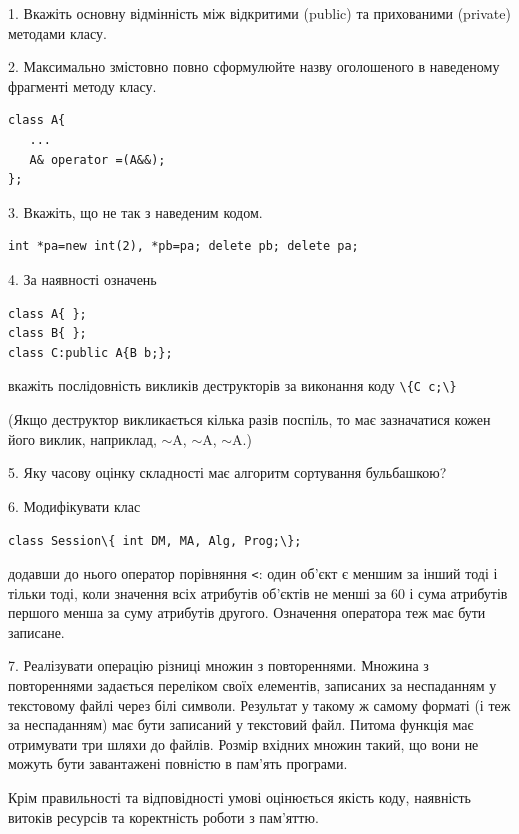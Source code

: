 \documentclass[12pt, ukrainian]{article}
\def\code#1{\Verb!#1!}
\begin{document}
{%
1. Вкажіть основну відмінність між відкритими (public) та прихованими (private) методами класу.%
\par
\vspace{2mm}
2. Максимально змістовно повно сформулюйте назву оголошеного в наведеному фрагменті методу класу.
\vspace{-3mm}
\begin{verbatim}class A{
   ...
   A& operator =(A&&);
};\end{verbatim}
\vspace{-3mm}
\par
\vspace{2mm}
3. Вкажіть, що не так з наведеним кодом.
\vspace{-3mm}
\begin{verbatim}int *pa=new int(2), *pb=pa; delete pb; delete pa;\end{verbatim}
\vspace{-3mm}
\par
\vspace{2mm}
4. За наявності означень
\vspace{-3mm}
\begin{verbatim}
class A{ };
class B{ };
class C:public A{B b;};\end{verbatim}
\vspace{-3mm}
вкажіть послідовність викликів деструкторів за виконання коду \code{\{C c;\}} 

(Якщо деструктор викликається кілька разів поспіль, то має зазначатися кожен його виклик, наприклад, $\sim$A, $\sim$A, $\sim$A.)

\vspace{2mm}
5. Яку часову оцінку складності має алгоритм сортування бульбашкою?
\par
\vspace{2mm}
6. Модифікувати клас 

\qquad\code{class Session\{ int DM, MA, Alg, Prog;\};} 


додавши до нього оператор порівняння \code{<}: один об'єкт є меншим за інший тоді і тільки тоді, коли значення всіх атрибутів об'єктів не менші за 60 і сума атрибутів першого менша за суму атрибутів другого. Означення оператора теж має бути записане.%
\par
\vspace{2mm}
7. 
Реалізувати операцію різниці множин з повтореннями. Множина з повтореннями задається переліком своїх елементів, записаних за неспаданням у текстовому файлі через білі символи. Результат у такому ж самому форматі (і теж за неспаданням) має бути записаний у текстовий файл. Питома функція має отримувати три шляхи до файлів. Розмір вхідних множин такий, що вони не можуть бути завантажені повністю в пам’ять програми.

Крім правильності та відповідності умові оцінюється якість коду, наявність витоків ресурсів та коректність роботи з пам'яттю. 

}
\end{document}
